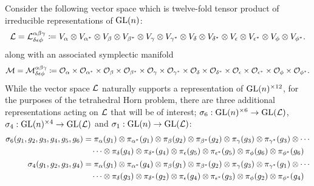 \documentclass[notitlepage, 10pt]{article}
\begin{document}
\begin{rem}
    Consider the following vector space which is twelve-fold tensor product of irreducible representations of $\operatorname{GL}(n)$:
    \begin{equation}
        \mathcal L = \mathcal L^{\alpha\beta\gamma}_{\delta\epsilon\phi} \coloneqq V_{\alpha}\otimes V_{\alpha^*} \otimes V_{\beta} \otimes V_{\beta^*} \otimes V_{\gamma} \otimes V_{\gamma^*} \otimes V_{\delta} \otimes V_{\delta^*} \otimes V_{\epsilon} \otimes V_{\epsilon^*} \otimes V_{\phi} \otimes V_{\phi^*}.
    \end{equation}
    along with an associated symplectic manifold
    \begin{equation}
        \mathcal M = \mathcal M^{\alpha\beta\gamma}_{\delta\epsilon\phi} \coloneqq \mathcal O_{\alpha} \times \mathcal O_{\alpha^*} \times \mathcal O_{\beta} \times \mathcal O_{\beta^*} \times \mathcal O_{\gamma} \times \mathcal O_{\gamma^*} \times \mathcal O_{\delta} \times \mathcal O_{\delta^*} \times \mathcal O_{\epsilon} \times \mathcal O_{\epsilon^*} \times \mathcal O_{\phi} \times \mathcal O_{\phi^*}.
    \end{equation}
    While the vector space $\mathcal L$ naturally supports a representation of $\operatorname{GL}(n)^{\times 12}$, for the purposes of the tetrahedral Horn problem, there are three additional representations acting on $\mathcal L$ that will be of interest; $\sigma_6 : \operatorname{GL}(n)^{\times 6} \to \operatorname{GL}(\mathcal L)$, $\sigma_4 : \operatorname{GL}(n)^{\times 4} \to \operatorname{GL}(\mathcal L)$ and $\sigma_1 : \operatorname{GL}(n) \to \operatorname{GL}(\mathcal L)$:
    \begin{align}
        \begin{split}
            \label{eq:six_fold_action}
            \sigma_{6}(g_1, g_2, g_3, g_4, g_5, g_6)
            &= \pi_{\alpha}(g_1) \ot \pi_{\alpha^*}(g_1) \ot \pi_{\beta}(g_2) \ot \pi_{\beta^*}(g_2) \ot \pi_{\gamma}(g_3) \ot \pi_{\gamma^*}(g_3) \ot \cdots \\ &\quad\cdots\ot\pi_{\delta}(g_4) \ot \pi_{\delta^*}(g_4) \ot \pi_{\epsilon}(g_5) \ot \pi_{\epsilon^*}(g_5) \ot \pi_{\phi}(g_6) \ot \pi_{\phi^*}(g_6)
        \end{split}\\
        \begin{split}
            \label{eq:four_fold_action}
            \sigma_{4}(g_1, g_2, g_3, g_4) 
            &= \pi_{\alpha}(g_1) \ot \pi_{\alpha^*}(g_4) \ot \pi_{\beta}(g_1) \ot \pi_{\beta^*}(g_2) \ot \pi_{\gamma}(g_3) \ot \pi_{\gamma^*}(g_1) \ot \cdots \\ &\quad\cdots\ot\pi_{\delta}(g_3) \ot \pi_{\delta^*}(g_2) \ot \pi_{\epsilon}(g_4) \ot \pi_{\epsilon^*}(g_3) \ot \pi_{\phi}(g_2) \ot \pi_{\phi^*}(g_4)
        \end{split}\\

\end{align}
\end{rem}
\end{document}
